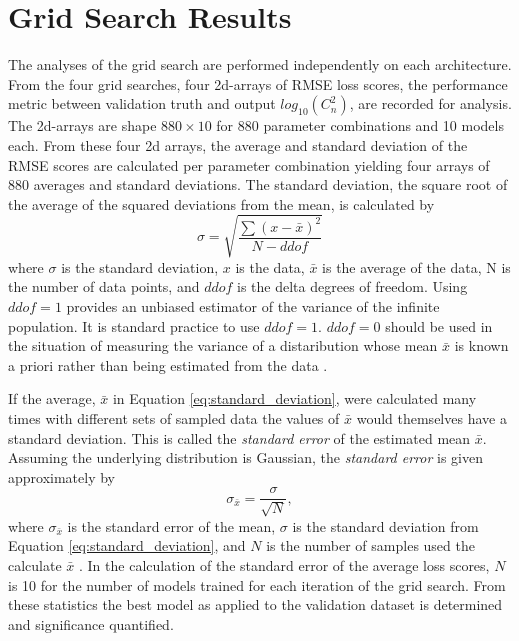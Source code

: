 \section{Grid Search Results}
The analyses of the grid search are performed independently on each architecture. From the four grid searches, four 2d-arrays of \ac{RMSE} loss scores, the performance metric between validation truth and output $log_{10}(C_{n}^{2})$, are recorded for analysis. The 2d-arrays are shape $880 \times 10$ for 880 parameter combinations and 10 models each. From these four 2d arrays, the average and standard deviation of the \ac{RMSE} scores are calculated per parameter combination yielding four arrays of 880 averages and standard deviations. The standard deviation, the square root of the average of the squared deviations from the mean, is calculated by
\begin{equation} \label{eq:standard_deviation}
	\sigma = \sqrt{\frac{\sum\left(x - \bar{x}\right)^{2}}{N - ddof}}
\end{equation}
where $\sigma$ is the standard deviation, $x$ is the data, $\bar{x}$ is the average of the data, N is the number of data points, and $ddof$ is the delta degrees of freedom. Using $ddof = 1$ provides an unbiased estimator of the variance of the infinite population. It is standard practice to use $ddof = 1$. $ddof = 0$ should be used in the situation of measuring the variance of a distaribution whose mean $\bar{x}$ is known a priori rather than being estimated from the data \cite{10.5555/1403886}.

If the average, $\bar{x}$ in Equation \ref{eq:standard_deviation}, were calculated many times with different sets of sampled data the values of $\bar{x}$ would themselves have a standard deviation. This is called the \textit{standard error} of the estimated mean $\bar{x}$. Assuming the underlying distribution is Gaussian, the \textit{standard error} is given approximately by
\begin{equation} \label{eq:standard_error}
	\sigma_{\bar{x}} = \frac{\sigma}{\sqrt{N}},
\end{equation}
where $\sigma_{\bar{x}}$ is the standard error of the mean, $\sigma$ is the standard deviation from Equation \ref{eq:standard_deviation}, and $N$ is the number of samples used the calculate $\bar{x}$ \cite{10.5555/1403886}. In the calculation of the standard error of the average loss scores, $N$ is 10 for the number of models trained for each iteration of the grid search. From these statistics the best model as applied to the validation dataset is determined and significance quantified.


